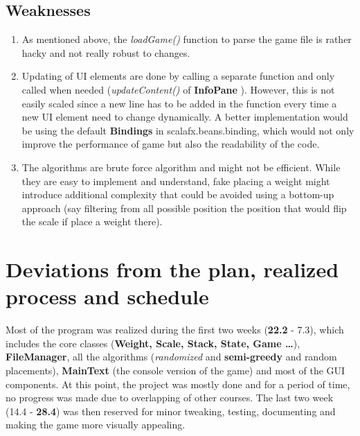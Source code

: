 \documentclass[12pt]{article}
\begin{document}
\subsection{Weaknesses}
\begin{enumerate}
  \item As mentioned above, the \textit{loadGame()} function to parse the game
    file is rather hacky and not really robust to changes.
  \item Updating of UI elements are done by calling a separate function and only
    called when needed (\textit{updateContent()} of \textbf{InfoPane} ).
    However, this is not easily scaled since a new line has to be added in the
    function every time a new UI element need to change dynamically. A better
    implementation would be using the default \textbf{Bindings} in
    scalafx.beans.binding, which would not only improve the performance of game
    but also the readability of the code.
  \item The algorithms are brute force algorithm and might not be
    efficient.  While they are easy to implement and understand, fake placing a
    weight might introduce additional complexity that could be avoided using a
    bottom-up approach (say filtering from all possible position the position
    that would flip the scale if place a weight there).
\end{enumerate}

\section{Deviations from the plan, realized process and schedule}

Most of the program was realized during the first two weeks (\textbf{22.2} -
7.3), which includes the core classes (\textbf{Weight, Scale, Stack, State, Game
\dots}), \textbf{FileManager}, all the algorithms (\textit{randomized} and
\textbf{semi-greedy}  and random placements), \textbf{MainText} (the console
version of the game) and most of the GUI components. At this point, the project
was mostly done and for a period of time, no progress was made due to
overlapping of other courses. The last two week (14.4 - \textbf{28.4}) was then
reserved for minor tweaking, testing, documenting and making the game more
visually appealing.
\end{document}
